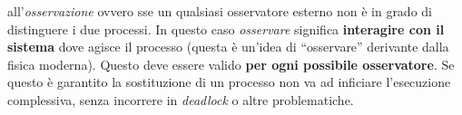 \documentclass[a4paper,12pt, oneside]{book}
\begin{document}
all'\textit{osservazione} ovvero sse un qualsiasi osservatore esterno non è in
grado di distinguere i due processi. In questo caso \textit{osservare} significa
\textbf{interagire con il sistema} dove agisce il processo (questa è un'idea di
``osservare'' derivante dalla fisica moderna). Questo deve essere valido
\textbf{per ogni possibile osservatore}. Se questo è garantito la sostituzione
di un processo non va ad inficiare l'esecuzione complessiva, senza incorrere in
\textit{deadlock} o altre problematiche.
\begin{figure}[H]
  \centering

\end{figure}
\end{document}
